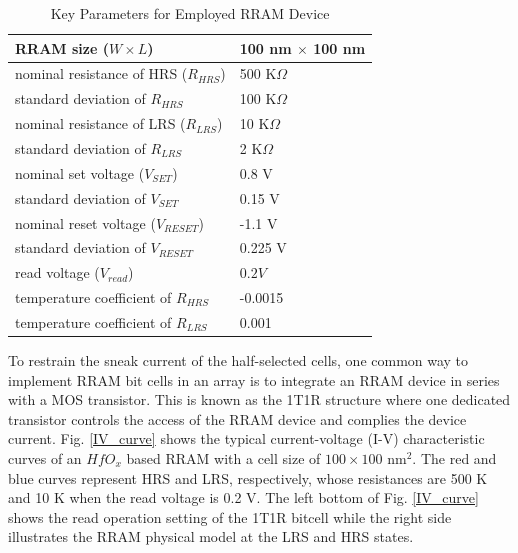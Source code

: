 \begin{table}[!t]
\centering
\caption{Key Parameters for Employed RRAM Device}
\label{tab_model}
 \begin{threeparttable}
\begin{tabular}{@{}m{5cm}<{\centering}|m{2.5cm}<{\centering}@{}}
\toprule[1.5pt]
\hline
RRAM size ($W\times L$)     & 100 nm $\times$ 100 nm  \\\hline
nominal resistance of HRS ($R_{HRS}$)   & 500 K$\Omega$  \\\hline
standard deviation of $R_{HRS}$   & 100 K$\Omega$  \\\hline
nominal resistance of LRS ($R_{LRS}$)  & 10 K$\Omega$  \\\hline
standard deviation of $R_{LRS}$   & 2 K$\Omega$  \\\hline
nominal set voltage ($V_{SET}$)        & 0.8 V  \\\hline
standard deviation of $V_{SET}$        & 0.15 V  \\\hline
nominal reset voltage ($V_{RESET}$)      & -1.1 V  \\\hline
standard deviation of $V_{RESET}$        & 0.225 V  \\\hline
read voltage ($V_{read}$)	& $0.2V$  \\\hline
temperature coefficient of $R_{HRS}$	& -0.0015  \\\hline
temperature coefficient of $R_{LRS}$	& 0.001  \\\hline
\bottomrule[1.5pt]
\end{tabular}
\end{threeparttable}
\end{table} 
 

To restrain the sneak current of the half-selected cells, one common way to implement RRAM bit cells in an array is to integrate an RRAM device in series with a MOS transistor. This is known as the 1T1R structure \cite{6936923} where one dedicated transistor controls the access of the RRAM device and complies the device current.
Fig. \ref{IV_curve} shows the typical current-voltage (I-V) characteristic curves of an $HfO_x$ based RRAM with a cell size of $100\times 100$ nm$^2$. The red and blue curves represent HRS and LRS, respectively, whose resistances are 500 K and 10 K when the read voltage is 0.2 V. The left bottom of Fig. \ref{IV_curve} shows the read operation setting of the 1T1R bitcell while the right side illustrates the RRAM physical model at the LRS and HRS states. 

